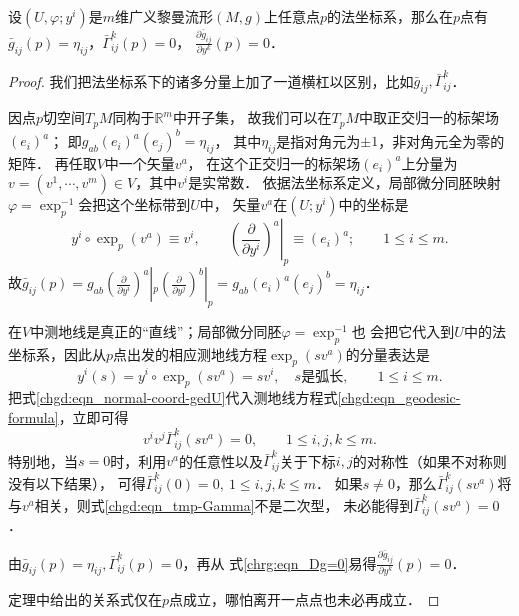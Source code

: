 

\begin{theorem}\label{chgd:thm_RNC}
    设$(U,\varphi;y^i)$是$m$维广义黎曼流形$(M,g)$上任意点$p$的法坐标系，那么在$p$点有
    $\bar{g}_{ij}(p)=\eta_{ij}$，$\bar{\Gamma}_{ij}^k(p)=0$，
    $\frac{\partial \bar{g}_{ij}}{\partial y^k}(p)=0$．
\end{theorem}
\begin{proof}
    我们把法坐标系下的诸多分量上加了一道横杠以区别，比如$\bar{g}_{ij},\bar{\Gamma}_{ij}^k$．

    因点$p$切空间$T_pM$同构于$\mathbb{R}^m$中开子集，
    故我们可以在$T_pM$中取正交归一的标架场$(e_i)^a$；
    即$g_{ab}(e_i)^a(e_j)^b= \eta_{ij}$，
    其中$\eta_{ij}$是指对角元为$\pm 1$，非对角元全为零的矩阵．
    再任取$V$中一个矢量$v^a$，
    在这个正交归一的标架场$(e_i)^a$上分量为$v=(v^1,\cdots,v^m)\in V$，其中$v^i$是实常数．
    依据法坐标系定义，局部微分同胚映射$\varphi = \exp_{p}^{-1}$会把这个坐标带到$U$中，
    矢量$v^a$在$(U;y^i)$中的坐标是
    \begin{equation}\label{chgd:eqn_normal-coord}
        y^i\circ\exp_{p}(v^a) \equiv v^i, \qquad
        \left.\left(\frac{\partial}{\partial y^i}\right)^a\right|_{p} \equiv (e_i)^a;
        \qquad 1\leqslant i\leqslant m.
    \end{equation}
    故$\bar{g}_{ij}(p)=g_{ab} (\frac{\partial}{\partial y^i})^a|_{p} (\frac{\partial}{\partial y^j})^b|_{p}
    =g_{ab}(e_i)^a(e_j)^b=\eta_{ij}$．

    在$V$中测地线是真正的“直线”；局部微分同胚$\varphi = \exp_{p}^{-1}$也
    会把它代入到$U$中的法坐标系，因此从$p$点出发的相应测地线方程$\exp_{p}(sv^a)$的分量表达是
    \begin{equation}\label{chgd:eqn_normal-coord-gedU}
        y^i(s)= y^i\circ \exp_{p}(s v^a) = s v^i,\quad s\text{是弧长},  \qquad 1\leqslant i\leqslant m.
    \end{equation}
    把式\eqref{chgd:eqn_normal-coord-gedU}代入测地线方程式\eqref{chgd:eqn_geodesic-formula}，立即可得
    \begin{equation}\label{chgd:eqn_tmp-Gamma}
        v^i v^j \bar{\Gamma}_{ij}^k(s v^a) = 0 ,\qquad 1\leqslant i,j,k\leqslant m .
    \end{equation}
    特别地，当$s=0$时，利用$v^a$的任意性以及$\bar{\Gamma}_{ij}^k$关于下标$i,j$的对称性（如果不对称则没有以下结果），
    可得$\bar{\Gamma}_{ij}^k(0)=0,\ 1\leqslant i,j,k\leqslant m $．
    如果$s\neq 0$，那么$\bar{\Gamma}_{ij}^k(s v^a)$将与$v^a$相关，则式\eqref{chgd:eqn_tmp-Gamma}不是二次型，
    未必能得到$\bar{\Gamma}_{ij}^k(s v^a)=0$．

    由$\bar{g}_{ij}(p)=\eta_{ij}, \bar{\Gamma}_{ij}^k(p)=0$，再从
    式\eqref{chrg:eqn_Dg=0}易得$\frac{\partial \bar{g}_{ij}}{\partial y^k}(p)=0$．


    定理中给出的关系式仅在$p$点成立，哪怕离开一点点也未必再成立．
\end{proof}

